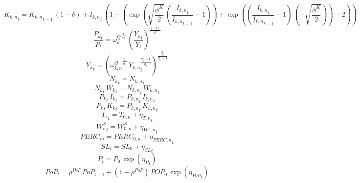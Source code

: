 \begin{dmath}
{{K_{k,n}}}_{t}={{K_{k,n}}}_{t-1}\, \left(1-{{\delta}}\right)+{{I_{k,n}}}_{t}\, \left(1-\left(\exp\left(\sqrt{\frac{{{\phi^{K}}}}{2}}\, \left(\frac{{{I_{k,n}}}_{t}}{{{I_{k,n}}}_{t-1}}-1\right)\right)+\exp\left(\left(\frac{{{I_{k,n}}}_{t}}{{{I_{k,n}}}_{t-1}}-1\right)\, \left(-\sqrt{\frac{{{\phi^{K}}}}{2}}\right)\right)-2\right)\right)
\end{dmath}
\begin{dmath}
\frac{{{P_k}}_{t}}{{P}_{t}}={{\omega^{Q}_{k}}}^{\frac{1}{{{\eta^{Q}}}}}\, \left(\frac{{{Y_k}}_{t}}{{Y}_{t}}\right)^{\frac{\left(-1\right)}{{{\eta^{Q}}}}}
\end{dmath}
\begin{dmath}
{{Y_k}}_{t}=\left({{\omega^{Q}_{k,n}}}^{\frac{1}{{{\eta^{C}_{k}}}}}\, {{Y_{k,n}}}_{t}^{\frac{{{\eta^{C}_{k}}}-1}{{{\eta^{C}_{k}}}}}\right)^{\frac{{{\eta^{C}_{k}}}}{{{\eta^{C}_{k}}}-1}}
\end{dmath}
\begin{dmath}
{{N_k}}_{t}={{N_{k,n}}}_{t}
\end{dmath}
\begin{dmath}
{{N_k}}_{t}\, {{W_k}}_{t}={{N_{k,n}}}_{t}\, {{W_{k,n}}}_{t}
\end{dmath}
\begin{dmath}
{{P_k}}_{t}\, {{I_k}}_{t}={{P_{k,n}}}_{t}\, {{I_{k,n}}}_{t}
\end{dmath}
\begin{dmath}
{{P_k}}_{t}\, {{K_k}}_{t}={{P_{k,n}}}_{t}\, {{K_{k,n}}}_{t}
\end{dmath}
\begin{dmath}
{{T_{r}}}_{t}={{T_{0,n}}}+{{\eta_{T,n}}}_{t}
\end{dmath}
\begin{dmath}
{{W_{r}^{S}}}_{t}={{W^{S}_{0,n}}}+{{\eta_{W^{S},n}}}_{t}
\end{dmath}
\begin{dmath}
{{PERC_{r}}}_{t}={{PERC_{0,n}}}+{{\eta_{PERC,n}}}_{t}
\end{dmath}
\begin{dmath}
{{SL}}_{t}={{SL_0}}+{{\eta_{SL}}}_{t}
\end{dmath}
\begin{dmath}
{P}_{t}={{P_0}}\, \exp\left({{\eta_{P}}}_{t}\right)
\end{dmath}
\begin{dmath}
{PoP}_{t}={{\rho^{PoP}}}\, {PoP}_{t-1}+\left(1-{{\rho^{PoP}}}\right)\, {{POP_0}}\, \exp\left({{\eta_{PoP}}}_{t}\right)
\end{dmath}
